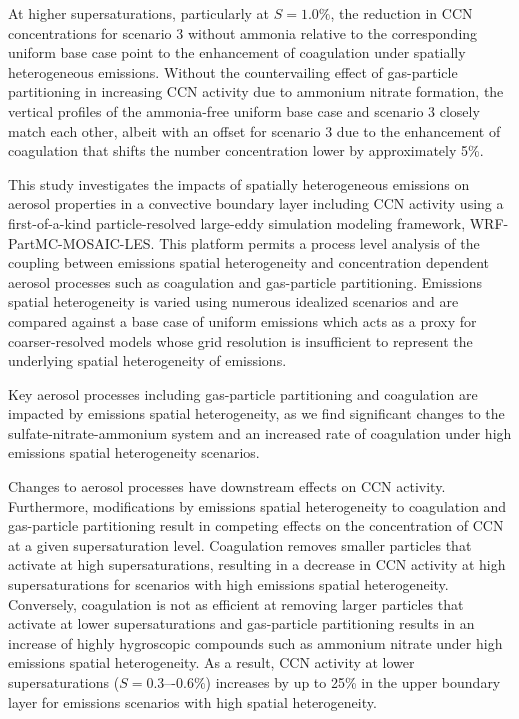 \documentclass[journal abbreviation, manuscript]{copernicus}
\begin{document}
At higher supersaturations, particularly at $S=1.0\%$, the reduction in CCN concentrations for scenario 3 without ammonia relative to the corresponding uniform base case point to the enhancement of coagulation under spatially heterogeneous emissions. Without the countervailing effect of gas-particle partitioning in increasing CCN activity due to ammonium nitrate formation, the vertical profiles of the ammonia-free uniform base case and scenario 3 closely match each other, albeit with an offset for scenario 3 due to the enhancement of coagulation that shifts the number concentration lower by approximately 5\%.  

\conclusions  %
This study investigates the impacts of spatially heterogeneous emissions on aerosol properties in a convective boundary layer including CCN activity using a first-of-a-kind particle-resolved large-eddy simulation modeling framework, WRF-PartMC-MOSAIC-LES. This platform permits a process level analysis of the coupling between emissions spatial heterogeneity and concentration dependent aerosol processes such as coagulation and gas-particle partitioning. Emissions spatial heterogeneity is varied using numerous idealized scenarios and are compared against a base case of uniform emissions which acts as a proxy for coarser-resolved models whose grid resolution is insufficient to represent the underlying spatial heterogeneity of emissions.

Key aerosol processes including gas-particle partitioning and coagulation are impacted by emissions spatial heterogeneity, as we find significant changes to the sulfate-nitrate-ammonium system and an increased rate of coagulation under high emissions spatial heterogeneity scenarios.

Changes to aerosol processes have downstream effects on CCN activity. Furthermore, modifications by emissions spatial heterogeneity to coagulation and gas-particle partitioning result in competing effects on the concentration of CCN at a given supersaturation level. Coagulation removes smaller particles that activate at high supersaturations, resulting in a decrease in CCN activity at high supersaturations for scenarios with high emissions spatial heterogeneity. Conversely, coagulation is not as efficient at removing larger particles that activate at lower supersaturations and gas-particle partitioning results in an increase of highly hygroscopic compounds such as ammonium nitrate under high emissions spatial heterogeneity. As a result, CCN activity at lower supersaturations ($S = 0.3\mbox{–-}0.6\%$) increases by up to 25\% in the upper boundary layer for emissions scenarios with high spatial heterogeneity.
\end{document}
